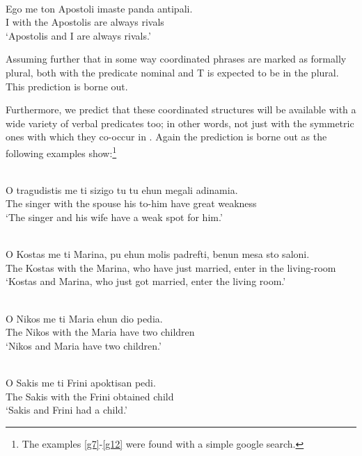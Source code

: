 \documentclass[output=paper]{langsci/langscibook}
\begin{document}
\ea\label{ex:key:29.32} \\
	\gll    Ego me ton Apostoli imaste panda antipali.\\
            I with the Apostolis are always rivals\\
    \glt    \enquote*{Apostolis and I are always rivals.}
\z

Assuming further that in some way coordinated phrases are marked as formally
plural,  both with the predicate nominal and T is expected to be
in the plural. This prediction is borne out.

Furthermore, we predict that these coordinated structures will be available
with a wide variety of verbal predicates too; in other words, not just with the
symmetric ones with which they co-occur in . Again the prediction
is borne out as the following examples show:\footnote{The examples
\eqref{g7}-\eqref{g12} were found with a simple google search.}

\ea\label{ex:key:29.33} \\
	\gll    O tragudistis me ti sizigo tu tu ehun megali adinamia.\\
            The singer with the spouse his to-him have great weakness\\ \label{g7}
    \glt    \enquote*{The singer and his wife have a weak spot for him.}
\z

\ea\label{ex:key:29.34} \\
	\gll    O Kostas me ti Marina, pu ehun molis padrefti, benun mesa sto
    saloni.\\
            The Kostas with the Marina, who have just married, enter in the living-room\\ \label{g8}
    \glt    \enquote*{Kostas and Marina, who just got married, enter the living
    room.}
\z

\ea\label{ex:key:29.35} \\
	\gll    O Nikos me ti Maria ehun dio pedia.\\
            The Nikos with the Maria have two children\\ \label{g9}
    \glt    \enquote*{Nikos and Maria have two children.}
\z

\ea\label{ex:key:29.36} \\
	\gll    O Sakis me ti Frini apoktisan pedi.\\
            The Sakis with the Frini obtained child\\ \label{g10}
    \glt    \enquote*{Sakis and Frini had a child.}
\z
\end{document}
